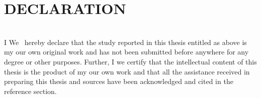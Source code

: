 \chapter*{DECLARATION}

\parbox{\textwidth}{\centering\MakeUppercase{\thetitle}}\\[14pt]

%

\noindent\ifdefined\theStudyType I \else We~\fi
hereby declare that the study reported in this thesis entitled as above is 
\ifdefined\theStudyType my \else our \fi
own original work and has not been 
submitted before anywhere for any degree or other purposes. Further,
\ifdefined\theStudyType I \else we \fi
certify that the intellectual content of this thesis is the product of 
\ifdefined\theStudyType my \else our \fi own work and that all the assistance received in preparing this thesis and sources have been acknowledged and cited in the reference section.


\vspace{10ex}



